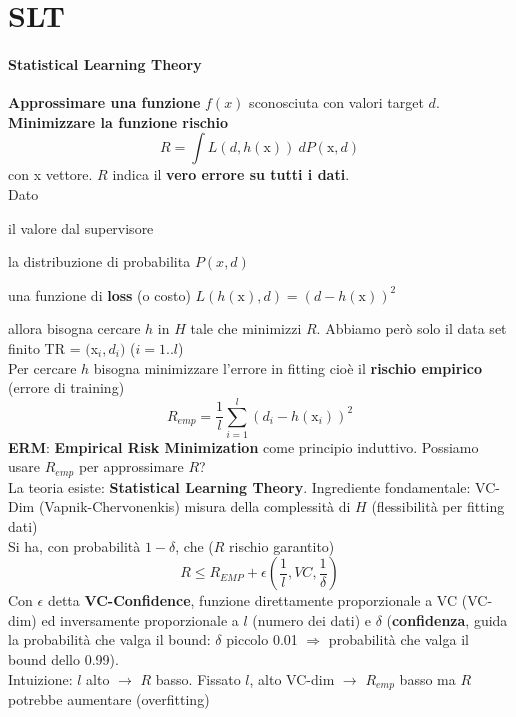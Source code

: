 \documentclass[10pt]{book}
\begin{document}
\section{SLT} \paragraph{Statistical Learning Theory} \textbf{Approssimare una funzione} $f(x)$ sconosciuta con valori target $d$. \textbf{Minimizzare la funzione rischio} $$R = \int L(d, h(\text{x}))\: dP(\text{x}, d)$$ con x vettore. $R$ indica il \textbf{vero errore su tutti i dati}.\\
Dato
\begin{list}{}{}
	\item il valore dal supervisore
	\item la distribuzione di probabilita $P(x,d)$
	\item una funzione di \textbf{loss} (o costo) $L(h(\text{x}), d) = (d - h(\text{x}))^2$
\end{list}
allora bisogna cercare $h$ in $H$ tale che minimizzi $R$. Abbiamo però solo il data set finito TR = $($x$_i, d_i)$ ($i = 1..l$)\\ Per cercare $h$ bisogna minimizzare l'errore in fitting cioè il \textbf{rischio empirico} (errore di training) $$R_{emp} = \frac{1}{l}\sum_{i = 1}^l \left(d_i - h(\text{x}_i)\right) ^2$$
\textbf{ERM}: \textbf{Empirical Risk Minimization} come principio induttivo. Possiamo usare $R_{emp}$ per approssimare $R$?\\
La teoria esiste: \textbf{Statistical Learning Theory}. Ingrediente fondamentale: VC-Dim (Vapnik-Chervonenkis) misura della complessità di $H$ (flessibilità per fitting dati)\\
Si ha, con probabilità $1 -\delta$, che ($R$ rischio garantito)
$$R\leq R_{EMP} + \epsilon\left(\frac{1}{l}, VC, \frac{1}{\delta}\right)$$
Con $\epsilon$ detta \textbf{VC-Confidence}, funzione direttamente proporzionale a VC (VC-dim) ed inversamente proporzionale a $l$ (numero dei dati) e $\delta$ (\textbf{confidenza}, guida la probabilità che valga il bound: $\delta$ piccolo 0.01 $\Rightarrow$ probabilità che valga il bound dello 0.99).\\
Intuizione: $l$ alto $\rightarrow$ $R$ basso. Fissato $l$, alto VC-dim $\rightarrow$ $R_{emp}$ basso ma $R$ potrebbe aumentare (overfitting)
\end{document}
